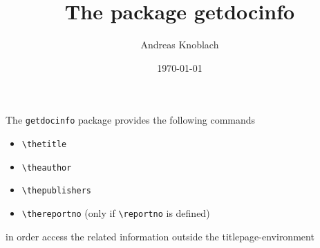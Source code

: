 \documentclass{scrartcl}
\title{The package getdocinfo}
\author{Andreas Knoblach}
\date{\today}
\begin{document}
\maketitle

\noindent
The \texttt{getdocinfo} package provides the following commands
\begin{itemize}
	\item \texttt{\textbackslash thetitle}
	\item \texttt{\textbackslash theauthor}
	\item \texttt{\textbackslash thepublishers}
	\item \texttt{\textbackslash thereportno} (only if \texttt{\textbackslash reportno} is defined)
\end{itemize}
in order access the related information outside the titlepage-environment
\end{document}
